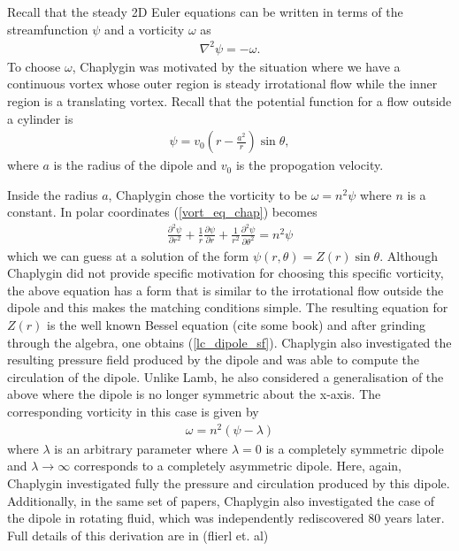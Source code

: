 Recall that the steady 2D Euler equations can be written in terms of the streamfunction $\psi$ and a vorticity $\omega$ as
\begin{align}
\nabla^{2} \psi = - \omega.\label{vort_eq_chap}
\end{align}
To choose $\omega$, Chaplygin was motivated by the situation where we have a continuous vortex whose outer region is steady irrotational flow while the inner region is a translating vortex. Recall that the potential function for a flow outside a cylinder is
\begin{align}
\psi = v_{0}\left(r - \frac{a^{2}}{r}\right)\sin\theta ,
\end{align}
where $a$ is the radius of the dipole and $v_{0}$ is the propogation velocity. 

Inside the radius $a$, Chaplygin chose the vorticity to be $\omega = n^{2}\psi$ where $n$ is a constant. In polar coordinates (\ref{vort_eq_chap}) becomes
\begin{align}
\frac{\partial^{2}\psi}{\partial r^{2}} + \frac{1}{r}\frac{\partial \psi}{\partial r} + \frac{1}{r^{2}}\frac{\partial^{2}\psi}{\partial \theta^{2}} =  n^{2}\psi
\end{align}
which we can guess at a solution of the form $\psi(r,\theta) = Z(r)\sin\theta$. Although Chaplygin did not provide specific motivation for choosing this specific vorticity, the above equation has a form that is similar to the irrotational flow outside the dipole and this makes the matching conditions simple. The resulting equation for $Z(r)$ is the well known Bessel equation (cite some book) and after grinding through the algebra, one obtains (\ref{lc_dipole_sf}). Chaplygin also investigated the resulting pressure field produced by the dipole and was able to compute the circulation of the dipole. Unlike Lamb, he also considered a generalisation of the above where the dipole is no longer symmetric about the x-axis. The corresponding vorticity in this case is given by
\begin{align}
\omega = n^{2}(\psi - \lambda)
\end{align}
where $\lambda$ is an arbitrary parameter where $\lambda=0$ is a completely symmetric dipole and $\lambda\rightarrow\infty$ corresponds to a completely asymmetric dipole. Here, again, Chaplygin investigated fully the pressure and circulation produced by this dipole. Additionally, in the same set of papers, Chaplygin also investigated the case of the dipole in rotating fluid, which was independently rediscovered 80 years later. Full details of this derivation are in \cite{meleshko1994} (flierl et. al) 


